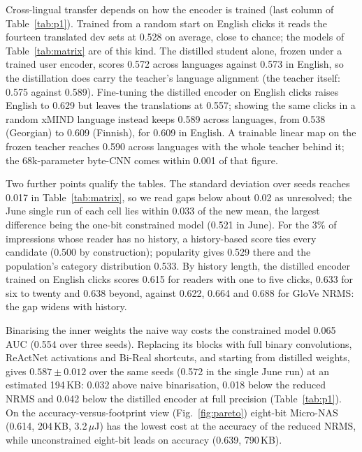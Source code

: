 \documentclass{llncs}
\newcommand{\uJ}{\,$\mu$J}
\begin{document}
Cross-lingual transfer depends on how the encoder is trained (last column of
Table~\ref{tab:p1}). Trained from a random start on English clicks it reads the
fourteen translated dev sets at 0.528 on average, close to chance; the models of
Table~\ref{tab:matrix} are of this kind. The distilled student alone, frozen under a trained user
encoder, scores 0.572 across languages against 0.573 in English, so the
distillation does carry the teacher's language alignment (the teacher itself:
0.575 against 0.589). Fine-tuning the distilled encoder on English clicks raises
English to 0.629 but leaves the translations at 0.557; showing the same clicks in
a random xMIND language instead keeps 0.589 across languages, from 0.538
(Georgian) to 0.609 (Finnish), for 0.609 in English. A trainable linear map on
the frozen teacher reaches 0.590 across languages with the whole teacher behind
it; the 68k-parameter byte-CNN comes within 0.001 of that figure.

Two further points qualify the tables. The standard deviation over seeds reaches
0.017 in Table~\ref{tab:matrix}, so we read gaps below about 0.02 as unresolved;
the June single run of each cell lies within 0.033 of the new mean, the largest
difference being the one-bit constrained model (0.521 in June). For the 3\% of impressions whose reader has
no history, a history-based score ties every candidate (0.500 by construction);
popularity gives 0.529 there and the population's category distribution 0.533. By
history length, the distilled encoder trained on English clicks scores 0.615 for
readers with one to five clicks, 0.633 for six to twenty and 0.638 beyond, against
0.622, 0.664 and 0.688 for GloVe NRMS: the gap widens with history.

Binarising the inner weights the naive way costs the constrained model 0.065
AUC (0.554 over three seeds). Replacing its blocks with full binary
convolutions, ReActNet activations and Bi-Real shortcuts, and starting from
distilled weights, gives $0.587\pm0.012$ over the same seeds (0.572 in the single
June run) at an estimated 194\,KB: 0.032 above naive binarisation, 0.018 below the
reduced NRMS and 0.042 below the distilled encoder at full precision
(Table~\ref{tab:p1}). On the accuracy-versus-footprint
view (Fig.~\ref{fig:pareto}) eight-bit Micro-NAS (0.614, 204\,KB, 3.2\uJ) has
the lowest cost at the accuracy of the reduced NRMS, while unconstrained
eight-bit leads on accuracy (0.639, 790\,KB).
\end{document}
